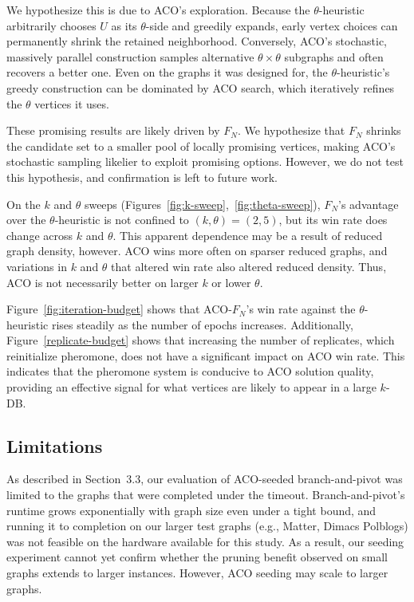 \documentclass[conference]{IEEEtran}
\begin{document}
We hypothesize this is due to ACO's exploration. Because the $\theta$-heuristic arbitrarily chooses $U$ as its $\theta$-side and greedily expands, early vertex choices can permanently shrink the retained neighborhood. Conversely, ACO's stochastic, massively parallel construction samples alternative $\theta \times \theta$ subgraphs and often recovers a better one. Even on the graphs it was designed for, the $\theta$-heuristic's greedy construction can be dominated by ACO search, which iteratively refines the $\theta$ vertices it uses.


These promising results are likely driven by $F_N$. We hypothesize that $F_N$ shrinks the candidate set to a smaller pool of locally promising vertices, making ACO's stochastic sampling likelier to exploit promising options. However, we do not test this hypothesis, and confirmation is left to future work.


On the $k$ and $\theta$ sweeps (Figures~\ref{fig:k-sweep},~\ref{fig:theta-sweep}), $F_N$'s advantage over the $\theta$-heuristic is not confined to $(k, \theta) = (2, 5)$, but its win rate does change across $k$ and $\theta$. This apparent dependence may be a result of reduced graph density, however. ACO wins more often on sparser reduced graphs, and variations in $k$ and $\theta$ that altered win rate also altered reduced density. Thus, ACO is not necessarily better on larger $k$ or lower $\theta$.


Figure~\ref{fig:iteration-budget} shows that ACO-$F_N$'s win rate against the $\theta$-heuristic rises steadily as the number of epochs increases. Additionally, Figure~\ref{replicate-budget} shows that increasing the number of replicates, which reinitialize pheromone, does not have a significant impact on ACO win rate. This indicates that the pheromone system is conducive to ACO solution quality, providing an effective signal for what vertices are likely to appear in a large $k$-DB.


\subsection{Limitations}


As described in Section~3.3, our evaluation of ACO-seeded branch-and-pivot was limited to the graphs that were completed under the timeout. Branch-and-pivot's runtime grows exponentially with graph size even under a tight bound, and running it to completion on our larger test graphs (e.g., Matter, Dimacs Polblogs) was not feasible on the hardware available for this study. As a result, our seeding experiment cannot yet confirm whether the pruning benefit observed on small graphs extends to larger instances. However, ACO seeding may scale to larger graphs.
\end{document}
